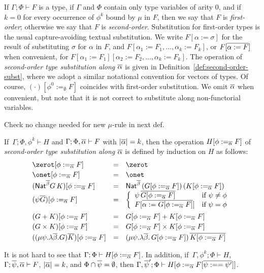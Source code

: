 \documentclass{lmcs}
\theoremstyle{plain}\newtheorem{satz}[thm]{Satz}
\begin{document}
If $\Gamma; \Phi \vdash F$ is a type, if $\Gamma$ and $\Phi$ contain
only type variables of arity $0$, and if $k=0$ for every occurrence of
$\phi^k$ bound by $\mu$ in $F$, then we say that $F$ is {\em
  first-order}; otherwise we say that $F$ is {\em
  second-order}. Substitution for first-order types is the usual
capture-avoiding textual substitution. We write $F[\alpha := \sigma]$
for the result of substituting $\sigma$ for $\alpha$ in $F$, and
$F[\alpha_1 := F_1,...,\alpha_k := F_k]$, or $F[\overline{\alpha := F}]$
when convenient, for $F[\alpha_1 := F_1][\alpha_2 := F_2,...,\alpha_k
  := F_k]$. The operation of {\em second-order type substitution along
  $\overline{\alpha}$} is given in Definition~\ref{def:second-order-subst},
where we adopt a similar notational convention for vectors of types.
Of course, $(\cdot)[\phi^0 :=_\emptyset F]$ coincides with first-order
substitution. We omit $\overline{\alpha}$ when convenient, but note that it
is not correct to substitute along non-functorial variables.

{\color{red} Check no change needed for new $\mu$-rule in next def.}
\begin{defi}\label{def:second-order-subst}
If \,$\Gamma; \Phi,\phi^k \vdash H$ and $\Gamma;\Phi, \overline{\alpha}
\vdash F$ with $|\overline{\alpha}| = k$, then the operation $H[\phi :=_{\overline{\alpha}} F]$ of {\em second-order type substitution along
  $\overline{\alpha}$} is defined by induction on $H$ as follows:
\[\begin{array}{lll}
\zerot[\phi :=_{\ol{\alpha}} F] & = & \zerot\\[0.5ex]
\onet[\phi :=_{\ol{\alpha}} F] & = & \onet\\[0.25ex]
(\Nat^{\ol\beta} G \,K)[\phi :=_{\ol{\alpha}} F]
& = & \Nat^{\ol\beta}\, (G[\phi :=_{\ol{\alpha}} F]) \,(K[\phi
  :=_{\ol{\alpha}} F])\\
(\psi\ol{G})[\phi :=_{\ol{\alpha}} F] & = &
\left\{\begin{array}{ll}
\psi \,\ol{G[\phi :=_{\ol{\alpha}} F]} & \mbox{if } \psi \not = \phi\\
  F[\ol{\alpha  := G[\phi :=_{\ol{\alpha}} F]}] 
  & \mbox{if } \psi = \phi
\end{array}\right.\\[2.8ex]
(G + K)[\phi :=_{\ol{\alpha}} F] & = & G[\phi
  :=_{\ol{\alpha}} F] + K[\phi :=_{\ol{\alpha}} F]\\[0.5ex] 
(G \times K)[\phi :=_{\ol{\alpha}} F] & = &
G[\phi :=_{\ol{\alpha}} F] \times K[\phi
  :=_{\ol{\alpha}} F]\\[0.5ex]   
((\mu \psi. \lambda \ol{\beta}. G)\ol{K})[\phi :=_{\ol{\alpha}}
  F] & = & (\mu \psi. \lambda \ol{\beta}. \,G[\phi :=_{\ol{\alpha}}
  F])\, \ol{K[\phi :=_{\ol{\alpha}} F]}
\end{array}\]
\end{defi}
\noindent
It is not hard to see that $\Gamma;\Phi \vdash H[\phi :=_{\overline{\alpha}}
  F]$. In addition, if \,$\Gamma, \phi^k; \Phi \vdash H$,\, $\Gamma;
\overline{\psi},\overline{\alpha} \vdash F$, $|\overline{\alpha}| = k$, and $\Phi \cap
\overline{\psi} = \emptyset$, then $\Gamma,\overline{\psi}';\Phi \vdash H[\phi
  :=_{\overline{\alpha}} F[\overline{\psi :== \psi'}]]$.
\end{document}
